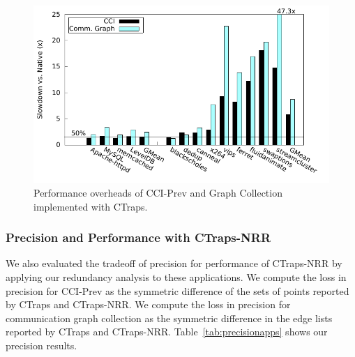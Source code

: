 \documentclass[preprint,9pt]{sigplanconf}
\newcommand{\addtodo}[1]{\textcolor{red}{[To do: #1]}}
\newcommand{\ctraps}{CTraps\xspace}
\newcommand{\ctrapsmm}{CTraps-NRR\xspace}
\begin{document}


\begin{figure}
\centering
\includegraphics[width=.9\columnwidth]{plots/appperf.pdf}
\caption{\label{fig:perfapps}Performance overheads of CCI-Prev and Graph Collection implemented with \ctraps.}
\end{figure}

\subsubsection{Precision and Performance with \ctrapsmm}
We also evaluated the tradeoff of precision for performance of \ctrapsmm by
applying our redundancy analysis to these applications.  We compute the loss in
precision for CCI-Prev as the symmetric difference of the sets of points
reported by \ctraps and \ctrapsmm.  We compute the loss in precision for
communication graph collection as the symmetric difference in the edge lists
reported by \ctraps and \ctrapsmm.  Table~\ref{tab:precisionapps} shows our
precision results.  
\end{document}
